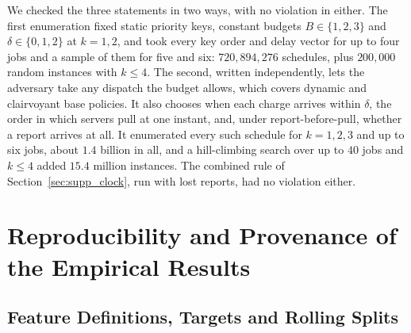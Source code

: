 \documentclass[mathematics,supfile,submit,moreauthors]{Definitions/mdpi}
\begin{document}
We checked the three statements in two ways, with no violation in either. The first
enumeration fixed static priority keys, constant budgets $B \in \{1, 2, 3\}$ and
$\delta \in \{0, 1, 2\}$ at $k = 1, 2$, and took every key order and delay vector for up
to four jobs and a sample of them for five and six: $720{,}894{,}276$ schedules, plus
$200{,}000$ random instances with $k \le 4$. The second, written independently, lets the
adversary take any dispatch the budget allows, which covers dynamic and clairvoyant
base policies. It also chooses when each charge arrives within $\delta$, the order in
which servers pull at one instant, and, under report-before-pull, whether a report
arrives at all. It enumerated every such schedule for $k = 1, 2, 3$ and up to six jobs,
about $1.4$ billion in all, and a hill-climbing search over up to $40$ jobs and $k \le 4$
added $15.4$ million instances. The combined rule of Section~\ref{sec:supp_clock}, run
with lost reports, had no violation either.


\section{Reproducibility and Provenance of the Empirical Results}
\label{sec:supp_repro}

\subsection{Feature Definitions, Targets and Rolling Splits}
\end{document}
